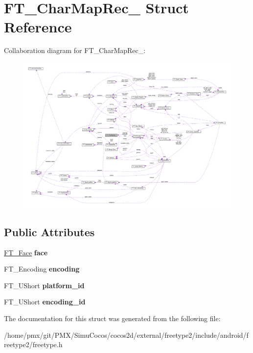 \hypertarget{structFT__CharMapRec__}{}\section{F\+T\+\_\+\+Char\+Map\+Rec\+\_\+ Struct Reference}
\label{structFT__CharMapRec__}


Collaboration diagram for F\+T\+\_\+\+Char\+Map\+Rec\+\_\+\+:
\nopagebreak
\begin{figure}[H]
\begin{center}
\leavevmode
\includegraphics[width=350pt]{structFT__CharMapRec____coll__graph}
\end{center}
\end{figure}
\subsection*{Public Attributes}
\begin{DoxyCompactItemize}
\item 
\mbox{\label{structFT__CharMapRec___a70a4e53e3f9818209916e5745c46dc28}} 
\hyperlink{structFT__FaceRec__}{F\+T\+\_\+\+Face} {\bfseries face}
\item 
\mbox{\label{structFT__CharMapRec___a88ee6f726ef11a8e6cc793d59ff5557e}} 
F\+T\+\_\+\+Encoding {\bfseries encoding}
\item 
\mbox{\label{structFT__CharMapRec___ae7f439996a8615698e780ce3c4f92457}} 
F\+T\+\_\+\+U\+Short {\bfseries platform\+\_\+id}
\item 
\mbox{\label{structFT__CharMapRec___af10dd43eee8dc93e7d6191c663ae831a}} 
F\+T\+\_\+\+U\+Short {\bfseries encoding\+\_\+id}
\end{DoxyCompactItemize}


The documentation for this struct was generated from the following file\+:\begin{DoxyCompactItemize}
\item 
/home/pmx/git/\+P\+M\+X/\+Simu\+Cocos/cocos2d/external/freetype2/include/android/freetype2/freetype.\+h\end{DoxyCompactItemize}
